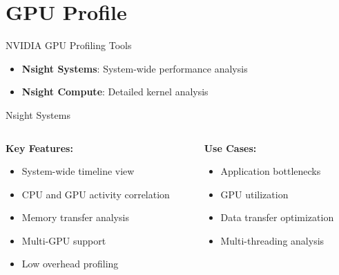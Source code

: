 \section{GPU Profile}

\begin{frame}{NVIDIA GPU Profiling Tools}
    \begin{itemize}
        \item \textbf{Nsight Systems}: System-wide performance analysis
        \item \textbf{Nsight Compute}: Detailed kernel analysis
    \end{itemize}
\end{frame}

\begin{frame}{Nsight Systems}
    \begin{columns}
        \begin{column}{0.6\textwidth}
            \textbf{Key Features:}
            \begin{itemize}
                \item System-wide timeline view
                \item CPU and GPU activity correlation
                \item Memory transfer analysis
                \item Multi-GPU support
                \item Low overhead profiling
            \end{itemize}
        \end{column}
        \begin{column}{0.4\textwidth}
            \textbf{Use Cases:}
            \begin{itemize}
                \item Application bottlenecks
                \item GPU utilization
                \item Data transfer optimization
                \item Multi-threading analysis
            \end{itemize}
        \end{column}
    \end{columns}
\end{frame}

